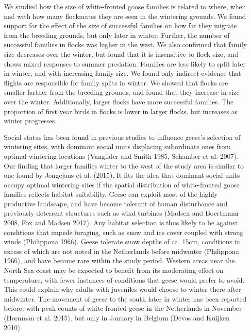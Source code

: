\documentclass[10pt,twocolumn]{paper}
\begin{document}
We studied how the size of white-fronted goose families is related to
where, when and with how many flockmates they are seen in the wintering
grounds. We found support for the effect of the size of successful
families on how far they migrate from the breeding grounds, but only
later in winter. Further, the number of successful families in flocks
was higher in the west. We also confirmed that family size decreases
over the winter, but found that it is insensitive to flock size, and
shows mixed responses to summer predation. Families are less likely to
split later in winter, and with increasing family size. We found only
indirect evidence that flights are responsible for family splits in
winter. We showed that flocks are smaller farther from the breeding
grounds, and found that they increase in size over the winter.
Additionally, larger flocks have more successful families. The
proportion of first year birds in flocks is lower in larger flocks, but
increases as winter progresses.

Social status has been found in previous studies to influence geese's
selection of wintering sites, with dominant social units displacing
subordinate ones from optimal wintering locations (Vangilder and Smith
1985, Schamber et al. 2007). Our finding that larger families winter to
the west of the study area is similar to one found by Jongejans et al.
(2015). It fits the idea that dominant social units occupy optimal
wintering sites if the spatial distribution of white-fronted goose
families reflects habitat suitability. Geese can exploit most of the
highly productive landscape, and have become tolerant of human
disturbance and previously deterrent structures such as wind turbines
(Madsen and Boertmann 2008, Fox and Madsen 2017). Any habitat selection
is thus likely to be against conditions that impede foraging, such as
snow and ice cover coupled with strong winds (Philippona 1966). Geese
tolerate snow depths of ca. 15cm, conditions in excess of which are not
noted in the Netherlands before midwinter (Philippona 1966), and have
become rare within the study period. Western areas near the North Sea
coast may be expected to benefit from its moderating effect on
temperature, with fewer instances of conditions that geese would prefer
to avoid. This could explain why adults with juveniles would choose to
winter there after midwinter. The movement of geese to the south later
in winter has been reported before, with peak counts of white-fronted
geese in the Netherlands in November (Hornman et al. 2015), but only in
January in Belgium (Devos and Kuijken 2010).
\end{document}
